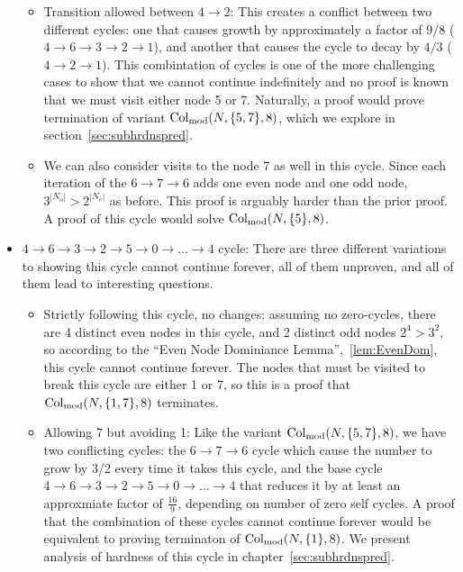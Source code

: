 \begin{itemize}
\begin{itemize}
  \item Transition allowed between $4 \rightarrow 2$: This creates a conflict between two different cycles: one that causes growth by approximately a factor of $9/8$ ($4 \rightarrow 6 \rightarrow 3 \rightarrow 2 \rightarrow 1$), and another that causes the cycle to decay by $4/3$ ($4 \rightarrow 2 \rightarrow 1$). This combintation of cycles is one of the more challenging cases to show that we cannot continue indefinitely and no proof is known that we must visit either node 5 or 7. Naturally, a proof would prove termination of variant $\mathrm{Col}_{\text{mod}}(N,\{5,7\},8)$, which we explore in section~\ref{sec:subhrdnspred}.
  \item We can also consider visits to the node 7 as well in this cycle. Since each iteration of the $6 \rightarrow 7 \rightarrow 6$ adds one even node and one odd node, $3^{|N_o|} > 2^{|N_e|}$ as before. This proof is arguably harder than the prior proof. A proof of this cycle would solve $\mathrm{Col}_{\text{mod}}(N,\{5\},8)$.
\end{itemize}
\item $4 \rightarrow 6 \rightarrow 3 \rightarrow 2 \rightarrow 5 \rightarrow 0 \rightarrow \ldots \rightarrow 4$ cycle: There are three different variations to showing this cycle cannot continue forever, all of them unproven, and all of them lead to interesting questions.
    \begin{itemize}
        \item Strictly following this cycle, no changes: assuming no zero-cycles, there are 4 distinct even nodes in this cycle, and 2 distinct odd nodes $2^4 > 3^2$, so according to the ``Even Node Dominiance Lemma'',~\ref{lem:EvenDom}, this cycle cannot continue forever. The nodes that must be visited to break this cycle are either 1 or 7, so this is a proof that $\mathrm{Col}_{\text{mod}}(N,\{1,7\},8)$ terminates.
        \item Allowing 7 but avoiding 1: Like the variant $\mathrm{Col}_{\text{mod}}(N,\{5,7\},8)$, we have two conflicting cycles: the $6 \rightarrow 7 \rightarrow 6$ cycle which cause the number to grow by 3/2 every time it takes this cycle, and the base cycle $4 \rightarrow 6 \rightarrow 3 \rightarrow 2 \rightarrow 5 \rightarrow 0 \rightarrow \ldots \rightarrow 4$ that reduces it by at least an approxmiate factor of $\frac{16}{9}$, depending on number of zero self cycles. A proof that the combination of these cycles cannot continue forever would be equivalent to proving terminaton of $\mathrm{Col}_{\text{mod}}(N,\{1\},8)$. We present analysis of hardness of this cycle in chapter~\ref{sec:subhrdnspred}.

\end{itemize}
\end{itemize}
